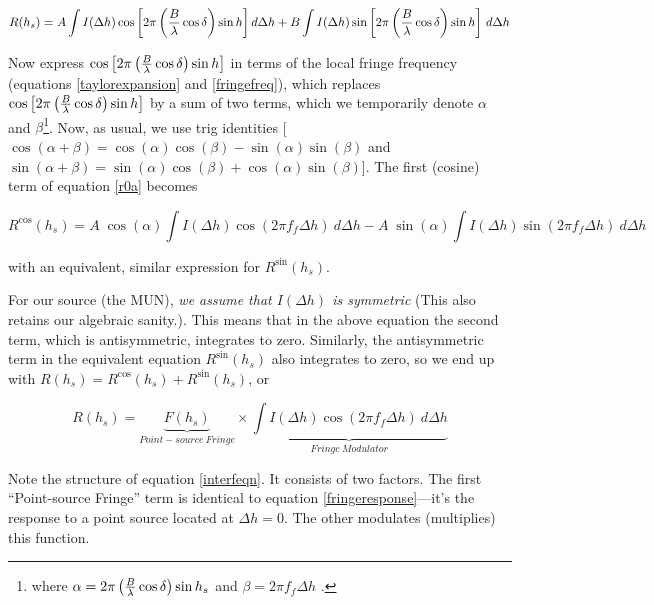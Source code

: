 \documentclass[11pt,preprint]{aastex}
\begin{document}
\begin{equation} \label{r0a}
R(h_s) = A \int I(\Delta h) \cos \left[ 2\pi \left( {B \over \lambda}
	\cos\delta \right) \sin h\right] d \Delta h +  
	B \int I(\Delta h) \sin\left[ 2\pi \left( {B \over \lambda}
	\cos\delta \right) \sin h \right] \, d \Delta h
\end{equation} 

Now express $\cos \left[ 2\pi \left( {B \over \lambda} \cos\delta
\right) \sin h\right]$ in terms of the local fringe frequency (equations
\ref{taylorexpansion} and \ref{fringefreq}), which replaces $\cos \left[
2\pi \left( {B \over \lambda} \cos\delta \right) \sin h\right]$ by a sum
of two terms, which we temporarily denote $\alpha$ and
$\beta$\footnote{where $\alpha = 2 \pi \left( {B \over \lambda}
\cos\delta \right) \sin{h_s}$ and $\beta = 2 \pi f_f
\Delta h$ .}.  Now, as usual, we use trig identities [$\cos(\alpha +
\beta) = \cos(\alpha) \cos(\beta) - \sin(\alpha) \sin(\beta)$ and
$\sin(\alpha + \beta) = \sin(\alpha) \cos(\beta) + \cos(\alpha)
\sin(\beta)$]. The first (cosine) term of equation \ref{r0a} becomes

\begin{equation}
R^{\cos}(h_s) = A \; \cos(\alpha) \int I(\Delta h) \cos(2\pi f_f \Delta
h) \ d \Delta h 
-A \; \sin(\alpha) \int I(\Delta h) \sin(2\pi f_f \Delta
h) \ d \Delta h 
\end{equation}

\noindent with an equivalent, similar expression for $R^{\sin}(h_s)$.

For our source (the MUN), {\it we assume that $I(\Delta h)$ is
  symmetric} (This also retains our algebraic sanity.). This means that
in the above equation the second term, which is antisymmetric,
integrates to zero.  Similarly, the antisymmetric term in the equivalent
equation $R^{\sin}(h_s)$ also integrates to zero, so we end up with
$R(h_s) = R^{\cos}(h_s) + R^{\sin}(h_s)$, or

\begin{equation} \label{interfeqn}
R(h_s) = \underbrace{ F(h_s)}_{Point-source\ 
Fringe} \times 
\underbrace{\int I(\Delta h) \cos( 2\pi f_f \Delta h) \  d \Delta h}_{Fringe \ Modulator} 
\end{equation}

\noindent Note the structure of equation \ref{interfeqn}. It consists of
two factors. The first ``Point-source Fringe'' term is identical to equation
\ref{fringeresponse}---it's the response to a point source located at
$\Delta h=0$. The other modulates (multiplies) this function. 
\end{document}

